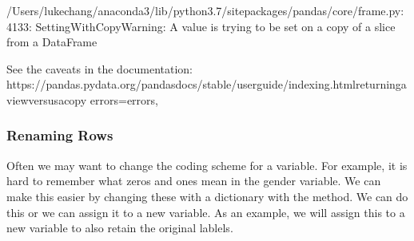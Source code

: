 \documentclass[letterpaper,10pt,english]{sphinxmanual}
\begin{document}
\begin{sphinxVerbatim}[commandchars=\\\{\}]
  
\end{sphinxVerbatim}

\begin{sphinxVerbatim}[commandchars=\\\{\}]
/Users/lukechang/anaconda3/lib/python3.7/site\PYGZhy{}packages/pandas/core/frame.py:4133: SettingWithCopyWarning: 
A value is trying to be set on a copy of a slice from a DataFrame

See the caveats in the documentation: https://pandas.pydata.org/pandas\PYGZhy{}docs/stable/user\PYGZus{}guide/indexing.html\PYGZsh{}returning\PYGZhy{}a\PYGZhy{}view\PYGZhy{}versus\PYGZhy{}a\PYGZhy{}copy
  errors=errors,
\end{sphinxVerbatim}


\subsubsection{Renaming Rows}
\label{\detokenize{content/Introduction_to_Pandas:renaming-rows}}
Often we may want to change the coding scheme for a variable. For example, it is hard to remember what zeros and ones mean in the gender variable. We can make this easier by changing these with a dictionary  with the  method. We can do this  or we can assign it to a new variable. As an example, we will assign this to a new variable to also retain the original lablels.

\begin{sphinxVerbatim}[commandchars=\\\{\}]
\PYG{p}{[}\PYG{p}{]}  \PYG{p}{[}\PYG{p}{]} 

\end{sphinxVerbatim}
\end{document}
